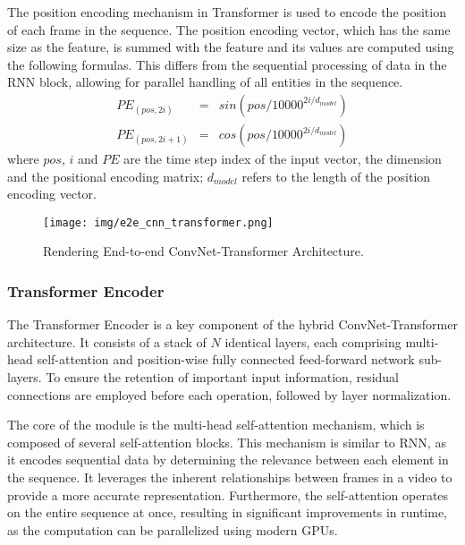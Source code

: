 \documentclass[fleqn,10pt]{wlscirep}
\begin{document}
The position encoding mechanism in Transformer is used to encode the position of each frame in the sequence. The position encoding vector, which has the same size as the feature, is summed with the feature and its values are computed using the following formulas. This differs from the sequential processing of data in the RNN block, allowing for parallel handling of all entities in the sequence.
\begin{equation}
\begin{array}{ccl}
PE_{(pos,2i)} & = & sin(pos\slash{10000^{2i\slash{d_{model}}}})\\
PE_{(pos,2i+1)} & = & cos(pos\slash{10000^{2i\slash{d_{model}}}})
\end{array} 
\label{eq:positionencoding}
\end{equation}
where $pos$, $i$ and $PE$ are the time step index of the input vector, the dimension and the positional encoding matrix; $d_{model}$ refers to the length of the position encoding vector.
\begin{figure}[htb!]
\begin{center}
\texttt{[image: img/e2e\_cnn\_transformer.png]}
\caption{Rendering End-to-end ConvNet-Transformer Architecture.}
\label{fig:e2e_cnn_transformer}
\end{center}
\end{figure}
\subsubsection{Transformer Encoder}


The Transformer Encoder is a key component of the hybrid ConvNet-Transformer architecture. It consists of a stack of $N$ identical layers, each comprising multi-head self-attention and position-wise fully connected feed-forward network sub-layers. To ensure the retention of important input information, residual connections are employed before each operation, followed by layer normalization.



The core of the module is the multi-head self-attention mechanism, which is composed of several self-attention blocks. This mechanism is similar to RNN, as it encodes sequential data by determining the relevance between each element in the sequence. It leverages the inherent relationships between frames in a video to provide a more accurate representation. Furthermore, the self-attention operates on the entire sequence at once, resulting in significant improvements in runtime, as the computation can be parallelized using modern GPUs.
\end{document}
